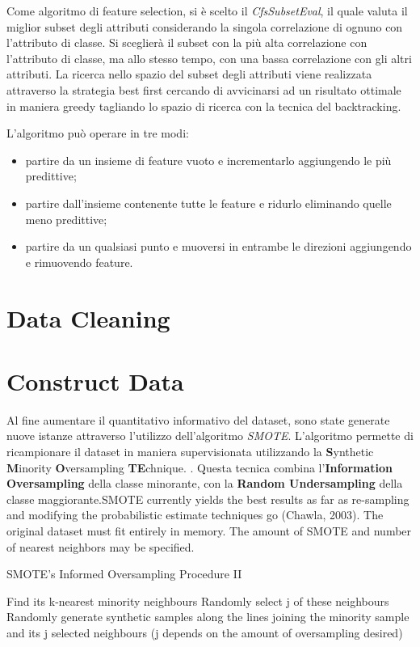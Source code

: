 Come algoritmo di feature selection, si è scelto il \textit{CfsSubsetEval}, il quale valuta il miglior subset degli attributi considerando la singola correlazione di ognuno con l'attributo di classe. Si sceglierà il subset con la più alta correlazione con l'attributo di classe, ma allo stesso tempo, con una bassa correlazione con gli altri attributi. La ricerca nello spazio del subset degli attributi viene realizzata attraverso la strategia best first cercando di avvicinarsi ad un risultato ottimale in maniera greedy tagliando lo spazio di ricerca con la tecnica del backtracking.\cite{Hall1998}

L'algoritmo può operare in tre modi:
\begin{itemize}
	\item partire da un insieme di feature vuoto e incrementarlo aggiungendo le più predittive;
	\item partire dall'insieme contenente tutte le feature e ridurlo eliminando quelle meno predittive;
	\item partire da un qualsiasi punto e muoversi in entrambe le direzioni aggiungendo e rimuovendo feature.
\end{itemize}

\section{Data Cleaning}

\section{Construct Data}
\label{SMOTE}
Al fine aumentare il quantitativo informativo del dataset, sono state generate nuove istanze attraverso l'utilizzo dell'algoritmo \textit{SMOTE}. L'algoritmo permette di ricampionare il dataset in maniera supervisionata utilizzando la \textbf{S}ynthetic \textbf{M}inority \textbf{O}versampling \textbf{TE}chnique. 
\cite{Chawla02smote:synthetic}. Questa tecnica combina l'\textbf{Information Oversampling} della classe minorante, con la \textbf{Random Undersampling} della classe maggiorante.SMOTE currently yields the best results as far as re-sampling and modifying the probabilistic estimate techniques go (Chawla, 2003).
The original dataset must fit entirely in memory. The amount of SMOTE and number of nearest neighbors may be specified.

\begin{algorithm}
	\caption{SMOTE’s Informed Oversampling Procedure II}
	\begin{algorithmic} 
		\STATE Find its k-nearest minority neighbours
		\STATE Randomly select j of these neighbours
		\STATE Randomly generate synthetic samples along the lines joining the minority sample and its j selected neighbours
		(j depends on the amount of oversampling desired) 
		\ENDFOR
	\end{algorithmic}
\end{algorithm}

